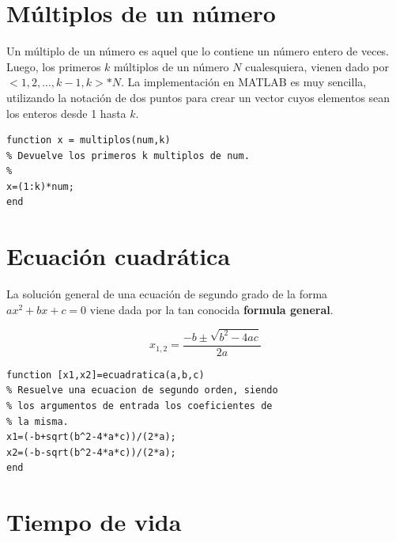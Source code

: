 \section{Múltiplos de un número}


\sol

Un múltiplo de un número es aquel que lo contiene un número entero de veces. Luego, los primeros $k$ 
múltiplos de un número $N$ cualesquiera, vienen dado por $<1,2,...,k-1,k>*N$. La implementación 
en MATLAB es muy sencilla, utilizando la notación de dos puntos para crear un vector cuyos elementos 
sean los enteros desde 1 hasta $k$.

\begin{verbatim}
function x = multiplos(num,k)
% Devuelve los primeros k multiplos de num.
%
x=(1:k)*num;
end
\end{verbatim}


\section{Ecuación cuadrática}


\sol

La solución general de una ecuación de segundo grado de la forma $ax^2+bx+c=0$ viene dada por la tan conocida 
{\bf formula general}.

$$x_{1,2}=\frac{-b\pm\sqrt{b^2-4ac}}{2a}$$

\begin{verbatim}
function [x1,x2]=ecuadratica(a,b,c)
% Resuelve una ecuacion de segundo orden, siendo
% los argumentos de entrada los coeficientes de
% la misma.
x1=(-b+sqrt(b^2-4*a*c))/(2*a);
x2=(-b-sqrt(b^2-4*a*c))/(2*a);
end
\end{verbatim}


\section{Tiempo de vida}


